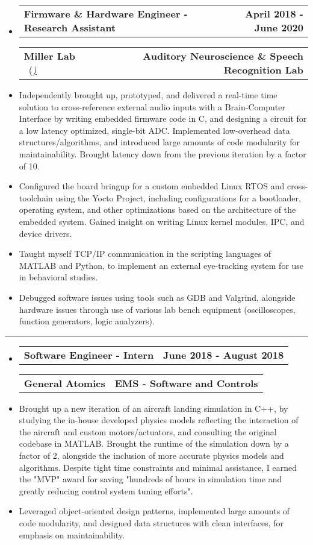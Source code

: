 \documentclass[10pt,letterpaper]{article}
\makeatletter
\newcommand{\header}[2]
{
	\begin{tabular*}{\linewidth}{l @{\extracolsep{\fill}} r}
		\hspace{-27pt} #1 & #2 \\
	\end{tabular*}
}
\makeatother
\begin{document}
\begin{itemize}
	\item[]
		\header
		{\textbf{Firmware \& Hardware Engineer - Research Assistant}} 
		{\textbf{April 2018 - June 2020}}
		\header
		{\textbf{Miller Lab} \ (\href{https://millerlab.faculty.ucdavis.edu}{\small \emph{\underline{\smash{millerlab.faculty.ucdavis.edu})}}} }
		{\textbf{Auditory Neuroscience \& Speech Recognition Lab}} 
	\item
		Independently brought up, prototyped, and delivered a real-time time solution to cross-reference external audio inputs with a Brain-Computer Interface by writing embedded firmware code in C, and designing a circuit for a low latency optimized, single-bit ADC. Implemented low-overhead data structures/algorithms, and introduced large amounts of code modularity for maintainability. Brought latency down from the previous iteration by a factor of 10.
	\item 
		Configured the board bringup for a custom embedded Linux RTOS and cross-toolchain using the Yocto Project, including configurations for a bootloader, operating system, and other optimizations based on the architecture of the embedded system. Gained insight on writing Linux kernel modules, IPC, and device drivers.
	\item 
		Taught myself TCP/IP communication in the scripting languages of MATLAB and Python, to implement an external eye-tracking system for use in behavioral studies.
	\item 
		Debugged software issues using tools such as GDB and Valgrind, alongside hardware issues through use of various lab bench equipment (oscilloscopes, function generators, logic analyzers).
\end{itemize}

\hrule

\begin{itemize}
	\item[]
		\header
		{\textbf{Software Engineer - Intern}} 
		{\textbf{June 2018 - August 2018}}
		\header
		{\textbf{General Atomics}}
		{\textbf{EMS - Software and Controls}} 
	\item
		Brought up a new iteration of an aircraft landing simulation in C++, by studying the in-house developed physics models reflecting the interaction of the aircraft and custom motors/actuators, and consulting the original codebase in MATLAB. Brought the runtime of the simulation down by a factor of 2, alongside the inclusion of more accurate physics models and algorithms. Despite tight time constraints and minimal assistance, I earned the "MVP" award for saving "hundreds of hours in simulation time and greatly reducing control system tuning efforts". 

	\item
		Leveraged object-oriented design patterns, implemented large amounts of code modularity, and designed data structures with clean interfaces, for emphasis on maintainability.


\end{itemize}
\end{document}
